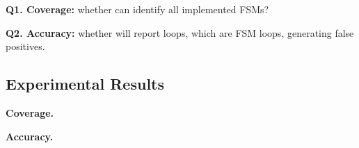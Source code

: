 \textbf{Q1. Coverage:} whether \Tool{} can identify all implemented FSMs?
 
\textbf{Q2. Accuracy:} whether \Tool{} will report loops, which are FSM loops, 
generating false positives. 


\subsection{Experimental Results}



\noindent\textbf{Coverage.}


\noindent\textbf{Accuracy.}